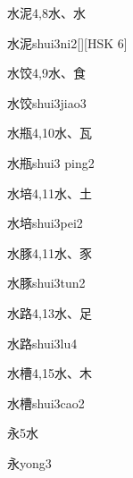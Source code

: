 \begin{Entry}{水泥}{4,8}{⽔、⽔}
  \begin{Phonetics}{水泥}{shui3ni2}[][HSK 6]
  \end{Phonetics}
\end{Entry}

\begin{Entry}{水饺}{4,9}{⽔、⾷}
  \begin{Phonetics}{水饺}{shui3jiao3}
  \end{Phonetics}
\end{Entry}

\begin{Entry}{水瓶}{4,10}{⽔、⽡}
  \begin{Phonetics}{水瓶}{shui3 ping2}
  \end{Phonetics}
\end{Entry}

\begin{Entry}{水培}{4,11}{⽔、⼟}
  \begin{Phonetics}{水培}{shui3pei2}
  \end{Phonetics}
\end{Entry}

\begin{Entry}{水豚}{4,11}{⽔、⾗}
  \begin{Phonetics}{水豚}{shui3tun2}
  \end{Phonetics}
\end{Entry}

\begin{Entry}{水路}{4,13}{⽔、⾜}
  \begin{Phonetics}{水路}{shui3lu4}
  \end{Phonetics}
\end{Entry}

\begin{Entry}{水槽}{4,15}{⽔、⽊}
  \begin{Phonetics}{水槽}{shui3cao2}
  \end{Phonetics}
\end{Entry}

\begin{Entry}{永}{5}{⽔}
  \begin{Phonetics}{永}{yong3}
  \end{Phonetics}
\end{Entry}

